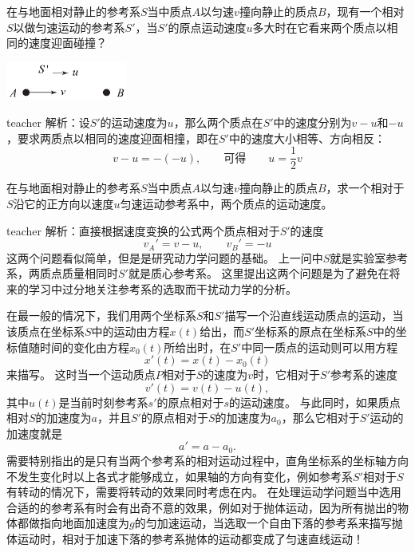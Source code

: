 \begin{example}
在与地面相对静止的参考系$S$当中质点$A$以匀速$v$撞向静止的质点$B$，现有一个相对$S$以做匀速运动的参考系$S'$，当$S'$的原点运动速度$u$多大时在它看来两个质点以相同的速度迎面碰撞？
\begin{flushright}
\includegraphics[width = 0.3\textwidth]{images/motion-40.pdf} 
\end{flushright}
\begin{taggedblock}{teacher}
\noindent
解析：设$S'$的运动速度为$u$，那么两个质点在$S'$中的速度分别为$v-u$和$-u$，要求两质点以相同的速度迎面相撞，即在$S'$中的速度大小相等、方向相反：
\[ v-u = -(-u),\qquad\textbf{可得}\qquad  u = \frac{1}{2}v\]
\end{taggedblock}
\end{example}



\begin{example}
在与地面相对静止的参考系$S$当中质点$A$以匀速$v$撞向静止的质点$B$，求一个相对于$S$沿它的正方向以速度$u$匀速运动参考系中，两个质点的运动速度。
\begin{taggedblock}{teacher}
\newline
解析：直接根据速度变换的公式两个质点相对于$S'$的速度
\[v_A' = v-u,\qquad v_B' = -u\]
这两个问题看似简单，但是是研究动力学问题的基础。
上一问中$S$就是实验室参考系，两质点质量相同时$S'$就是质心参考系。
这里提出这两个问题是为了避免在将来的学习中过分地关注参考系的选取而干扰动力学的分析。
\end{taggedblock}
\end{example}




在最一般的情况下，我们用两个坐标系$S$和$S'$描写一个沿直线运动质点的运动，当该质点在坐标系$S$中的运动由方程$x(t)$给出，而$S'$坐标系的原点在坐标系$S$中的坐标值随时间的变化由方程$x_0(t)$所给出时，在$S'$中同一质点的运动则可以用方程
\begin{equation}
x'(t)  = x(t)-x_0(t)
\end{equation}
来描写。
这时当一个运动质点$P$相对于$S$的速度为$v$时，它相对于$S'$参考系的速度
\begin{equation}
v'(t) = v(t)-u(t),
\end{equation}
其中$u(t)$是当前时刻参考系$s'$的原点相对于$s$的运动速度。
与此同时，如果质点相对$S$的加速度为$a$，并且$S'$的原点相对于$S$的加速度为$a_0$，那么它相对于$S'$运动的加速度就是
\begin{equation}
a'=a-a_0.
\end{equation}
需要特别指出的是只有当两个参考系的相对运动过程中，直角坐标系的坐标轴方向不发生变化时以上各式才能够成立，如果轴的方向有变化，例如参考系$S'$相对于$S$有转动的情况下，需要将转动的效果同时考虑在内。
在处理运动学问题当中选用合适的的参考系有时会有出奇不意的效果，例如对于抛体运动，因为所有抛出的物体都做指向地面加速度为$g$的匀加速运动，当选取一个自由下落的参考系来描写抛体运动时，相对于加速下落的参考系抛体的运动都变成了匀速直线运动！



